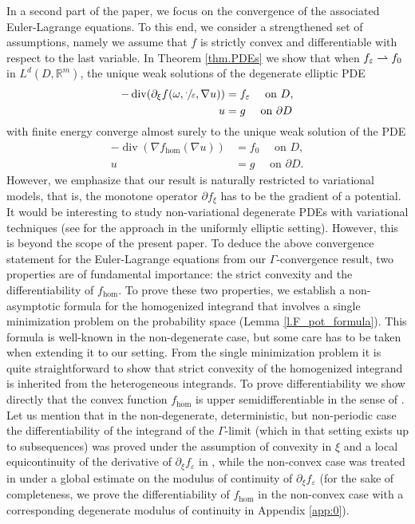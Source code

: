 \documentclass[10pt]{amsart}
\def\harptod{\mathrel{\relbar\joinrel\rightharpoonup}}
\def\harpto{\mathchoice{\harptod}{\rightharpoonup}{\rightharpoonup}{\rightharpoonup}}
\DeclareMathOperator{\dive}{div}
\theoremstyle{definition}
\let\e\varepsilon
\let\w\omega
\newcommand{\R}{\mathbb{R}}
\begin{document}
In a second part of the paper, we focus on the convergence of the associated Euler-Lagrange equations. To this end, we consider a strengthened set of assumptions, namely we assume that $f$ is strictly convex and differentiable with respect to the last variable. In Theorem \ref{thm.PDEs} we show that when $f_{\e}\harpto f_0$ in $L^d(D,\R^m)$, the unique weak solutions of the degenerate elliptic PDE
\begin{align*}
-\dive(\partial_{\xi }f(\w,\sfrac{\cdot}{\e},\nabla u))&=f_{\e}\quad\text{ on }D,
\\
u&=g\quad\text{ on }\partial D
\end{align*}
with finite energy converge almost surely to the unique weak solution of the PDE
\begin{align*}
-\dive(\nabla f_{\hom}(\nabla u))&=f_0\quad\text{ on }D,
\\
u&=g\quad\text{ on }\partial D.
\end{align*}
However, we emphasize that our result is naturally restricted to variational models, that is, the monotone operator $\partial f_{\xi}$ has to be the gradient of a potential. It would be interesting to study non-variational degenerate PDEs with variational techniques (see \cite{ArMo} for the approach in the uniformly elliptic setting). However, this is beyond the scope of the present paper. To deduce the above convergence statement for the Euler-Lagrange equations from our $\Gamma$-convergence result, two properties are of fundamental importance: the strict convexity and the differentiability of $f_{\hom}$. To prove these two properties, we establish a non-asymptotic formula for the homogenized integrand that involves a single minimization problem on the probability space (\cf Lemma \ref{l.F_pot_formula}). This formula is well-known in the non-degenerate case, but some care has to be taken when extending it to our setting. From the single minimization problem it is quite straightforward to show that strict convexity of the homogenized integrand is inherited from the heterogeneous integrands. To prove differentiability we show directly that the convex function $f_{\hom}$ is upper semidifferentiable in the sense of \cite{BKK}. Let us mention that in the non-degenerate, deterministic, but non-periodic case the differentiability of the integrand of the $\Gamma$-limit (which in that setting exists up to subsequences) was proved under the assumption of convexity in $\xi$ and a local equicontinuity of the derivative of $\partial_{\xi}f_{\e}$ in \cite[Prop.\,3.5]{GiPo}, while the non-convex case was treated in \cite[Th.\,2.8]{ADMZ} under a global estimate on the modulus of continuity of $\partial_{\xi}f_{\e}$ (for the sake of completeness, we prove the differentiability of $f_{\hom}$ in the non-convex case with a corresponding degenerate modulus of continuity in Appendix \ref{app:0}).
\end{document}
